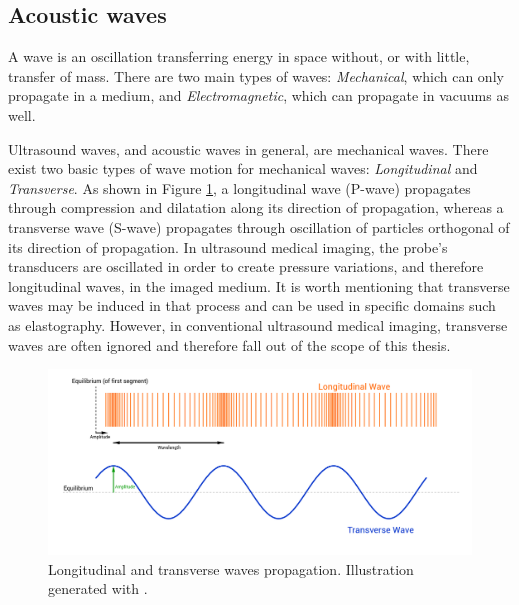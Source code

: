 \subsection{Acoustic waves}
\label{sec:physics_waves}
A wave is an oscillation transferring energy in space without, or with little, transfer of mass. There are two main types of waves: \textit{Mechanical}, which can only propagate in a medium, and \textit{Electromagnetic}, which can propagate in vacuums as well.
\par
Ultrasound waves, and acoustic waves in general, are mechanical waves.
There exist two basic types of wave motion for mechanical waves: \textit{Longitudinal} and \textit{Transverse}. As shown in Figure \ref{fig:wave_types}, a longitudinal wave (P-wave) propagates through compression and dilatation along its direction of propagation, whereas a transverse wave (S-wave) propagates through oscillation of particles orthogonal of its direction of propagation.
In ultrasound medical imaging, the probe's transducers are oscillated in order to create pressure variations, and therefore longitudinal waves, in the imaged medium.
It is worth mentioning that transverse waves may be induced in that process and can be used in specific domains such as elastography.
However, in conventional ultrasound medical imaging, transverse waves are often ignored and therefore fall out of the scope of this thesis.

\begin{figure}[ht]
    \includegraphics[width=\linewidth]{./images/background/wave_propagation.png}
	\caption[Longitudinal and transverse waves propagation.]{Longitudinal and transverse waves propagation. Illustration generated with \cite{wave_propagation}.}
	\label{fig:wave_types}
\end{figure}


